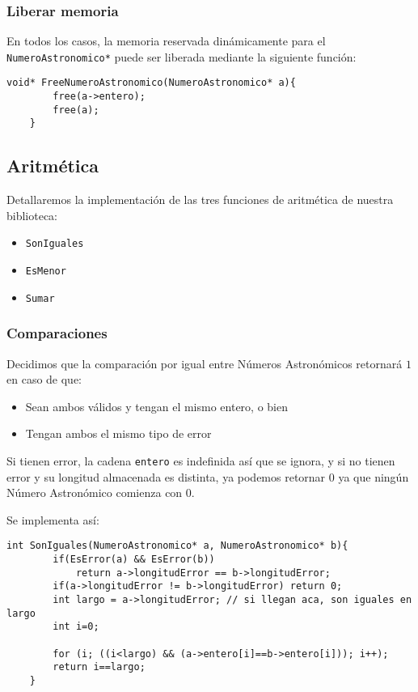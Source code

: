 \documentclass[a4paper, 12pt]{article}
\begin{document}
\subsubsection{Liberar memoria} \label{creacion-free}

En todos los casos, la memoria reservada dinámicamente para el \verb|NumeroAstronomico*| puede ser liberada mediante la siguiente función:

\begin{lstlisting}[style=C]
    void* FreeNumeroAstronomico(NumeroAstronomico* a){
        free(a->entero);
        free(a);
    }
\end{lstlisting}

\subsection{Aritmética} \label{aritmetica}
\bigbreak
Detallaremos la implementación de las tres funciones de aritmética de nuestra biblioteca:

\begin{itemize}
    \item \texttt{SonIguales}
    \item \texttt{EsMenor}
    \item \texttt{Sumar}
\end{itemize}

\subsubsection{Comparaciones}\label{aritmetica-comparaciones}
Decidimos que la comparación por igual entre Números Astronómicos retornará $1$ en caso de que:

\begin{itemize}
    \item Sean ambos válidos y tengan el mismo entero, o bien
    \item Tengan ambos el mismo tipo de error
\end{itemize}

Si tienen error, la cadena \verb|entero| es indefinida así que se ignora, y si no tienen error y su longitud almacenada es distinta, ya podemos retornar $0$ ya que ningún Número Astronómico comienza con $0$.

Se implementa así:

\begin{lstlisting}[style=C]
    int SonIguales(NumeroAstronomico* a, NumeroAstronomico* b){
        if(EsError(a) && EsError(b))
            return a->longitudError == b->longitudError;
        if(a->longitudError != b->longitudError) return 0;
        int largo = a->longitudError; // si llegan aca, son iguales en largo
        int i=0;
    
        for (i; ((i<largo) && (a->entero[i]==b->entero[i])); i++);
        return i==largo;
    }
\end{lstlisting}
\end{document}
